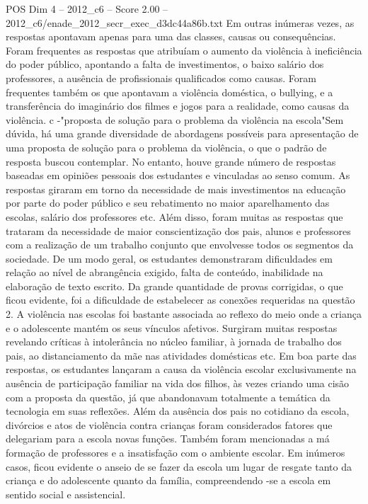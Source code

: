 \begin{textsample}{POS Dim 4 – 2012\_c6 – Score 2.00 – 2012\_c6/enade\_2012\_secr\_exec\_d3dc44a86b.txt}
Em outras inúmeras vezes, as respostas apontavam apenas para uma das classes, causas ou consequências.
Foram frequentes as respostas que atribuíam o aumento da violência à ineficiência do poder público, apontando a falta de investimentos, o baixo salário dos professores, a ausência de profissionais qualificados como causas.
Foram frequentes também os que apontavam a violência doméstica, o bullying, e a transferência do imaginário dos filmes e jogos para a realidade, como causas da violência. c -"proposta de solução para o problema da violência na escola"Sem dúvida, há uma grande diversidade de abordagens possíveis para apresentação de uma proposta de solução para o problema da violência, o que o padrão de resposta buscou contemplar.
No entanto, houve grande número de respostas baseadas em opiniões pessoais dos estudantes e vinculadas ao senso comum.
As respostas giraram em torno da necessidade de mais investimentos na educação por parte do poder público e seu rebatimento no maior aparelhamento das escolas, salário dos professores etc.
Além disso, foram muitas as respostas que trataram da necessidade de maior conscientização dos pais, alunos e professores com a realização de um trabalho conjunto que envolvesse todos os segmentos da sociedade.
De um modo geral, os estudantes demonstraram dificuldades em relação ao nível de abrangência exigido, falta de conteúdo, inabilidade na elaboração de texto escrito.
Da grande quantidade de provas corrigidas, o que ficou evidente, foi a dificuldade de estabelecer as conexões requeridas na questão 2.
A violência nas escolas foi bastante associada ao reflexo do meio onde a criança e o adolescente mantém os seus vínculos afetivos.
Surgiram muitas respostas revelando críticas à intolerância no núcleo familiar, à jornada de trabalho dos pais, ao distanciamento da mãe nas atividades domésticas etc.
Em boa parte das respostas, os estudantes lançaram a causa da violência escolar exclusivamente na ausência de participação familiar na vida dos filhos, às vezes criando uma cisão com a proposta da questão, já que abandonavam totalmente a temática da tecnologia em suas reflexões.
Além da ausência dos pais no cotidiano da escola, divórcios e atos de violência contra crianças foram considerados fatores que delegariam para a escola novas funções.
Também foram mencionadas a má formação de professores e a insatisfação com o ambiente escolar.
Em inúmeros casos, ficou evidente o anseio de se fazer da escola um lugar de resgate tanto da criança e do adolescente quanto da família, compreendendo -se a escola em sentido social e assistencial.

\end{textsample}
